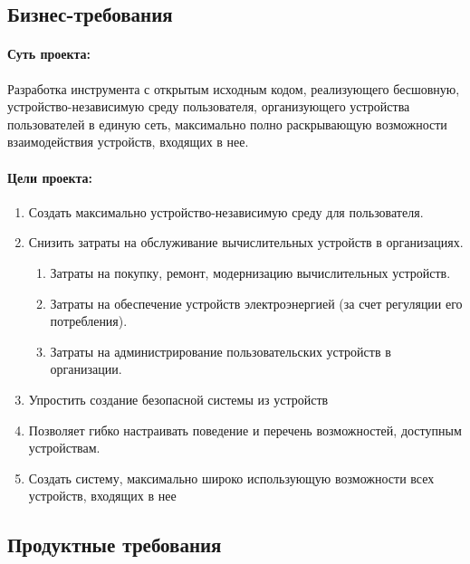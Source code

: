 \subsection*{Бизнес-требования}
\paragraph*{Суть проекта:}
Разработка инструмента с открытым исходным кодом, реализующего бесшовную, устройство-независимую среду пользователя, организующего устройства пользователей в единую сеть, максимально полно раскрывающую возможности взаимодействия устройств, входящих в нее.

\paragraph*{Цели проекта:}
\begin{enumerate}
   \item Создать максимально устройство-независимую среду для пользователя.
   \item Снизить затраты на обслуживание вычислительных устройств в организациях.
         \begin{enumerate}[nosep,label*={\arabic*.}]
            \item Затраты на покупку, ремонт, модернизацию вычислительных устройств.
            \item Затраты на обеспечение устройств электроэнергией (за счет регуляции его потребления).
            \item Затраты на администрирование пользовательских устройств в организации.
         \end{enumerate}
   \item Упростить создание безопасной системы из устройств
   \item Позволяет гибко настраивать поведение и перечень возможностей, доступным устройствам.
   \item Создать систему, максимально широко использующую возможности всех устройств, входящих в нее
\end{enumerate}
\subsection*{Продуктные требования}
